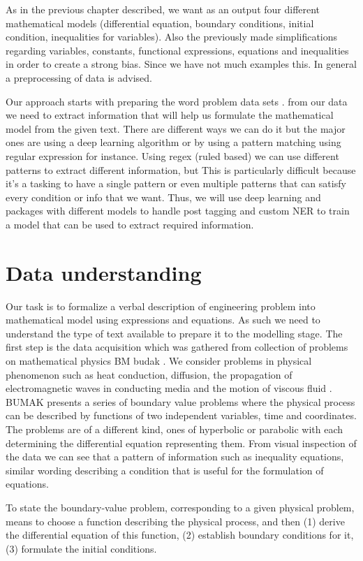 As in the previous chapter described, we want as an output four different mathematical models (differential equation, boundary conditions, initial condition, inequalities for variables). Also the previously made simplifications regarding variables, constants, functional expressions, equations and inequalities in order to create a strong bias. Since we have not much examples this. In general a preprocessing of data is advised.

Our approach starts with preparing the word problem data sets . from our data we need to extract information that will help us formulate the mathematical model from the given text. There are different ways we can do it but the major ones are using a deep learning algorithm or by using a pattern matching using regular expression for instance. 
Using regex (ruled based) we can use different patterns to extract different information, but This is particularly difficult because it’s a tasking to have a single pattern or even multiple patterns that can satisfy every condition or info that we want. 
Thus, we will use deep learning and packages with different models to handle post tagging and custom NER to train a model that can be used to extract required information. 

\section{Data understanding} 
Our task is to formalize a verbal description of engineering problem into mathematical model using expressions and equations. As such we need to understand the type of text available to prepare it to the modelling stage. 
The first step is the data acquisition which was gathered from collection of problems on mathematical physics BM budak .
We consider problems in physical phenomenon such as heat conduction, diffusion, the propagation of electromagnetic waves in conducting media and the motion of viscous fluid . 
BUMAK presents a series of boundary value problems where the physical process can be described by functions of two independent variables, time and coordinates.  
The problems are of a different kind, ones of hyperbolic or parabolic with each determining the differential equation representing them. 
From visual inspection of the data we can see that a pattern of information such as inequality equations, similar wording describing a condition that is useful for the formulation of equations.

To state the boundary-value problem, corresponding to a given physical problem, means to choose a function describing the physical process, and then
(1) derive the differential equation of this function,
(2) establish boundary conditions for it,
(3) formulate the initial conditions.

